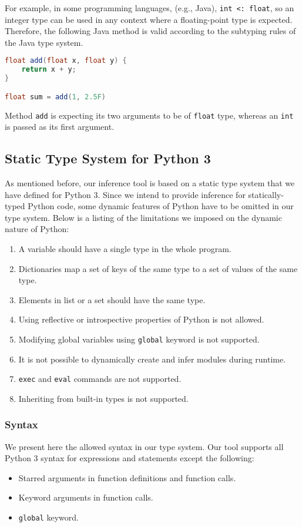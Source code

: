 For example, in some programming languages, (e.g., Java), \lstinline|int <: float|, so an integer type can be used in any context where a floating-point type is expected. Therefore, the following Java method is valid according to the subtyping rules of the Java type system.

\begin{lstlisting}[language=java]
float add(float x, float y) {
	return x + y;
}

float sum = add(1, 2.5F)
\end{lstlisting}

Method \lstinline|add| is expecting its two arguments to be of \lstinline|float| type, whereas an \lstinline|int| is passed as its first argument.


\subsection{Static Type System for Python 3}
As mentioned before, our inference tool is based on a static type system that we have defined for Python 3. Since we intend to provide inference for statically-typed Python code, some dynamic features of Python have to be omitted in our type system. Below is a listing of the limitations we imposed on the dynamic nature of Python:
\begin{enumerate}
	\item A variable should have a single type in the whole program.
	\item Dictionaries map a set of keys of the same type to a set of values of the same type.
	\item Elements in list or a set should have the same type.
	\item Using reflective or introspective properties of Python is not allowed.
	\item Modifying global variables using \lstinline|global| keyword is not supported.
	\item It is not possible to dynamically create and infer modules during runtime.
	\item \lstinline|exec| and \lstinline|eval| commands are not supported.
	\item Inheriting from built-in types is not supported.
\end{enumerate}

\subsubsection{Syntax}
We present here the allowed syntax in our type system. Our tool supports all Python 3 syntax for expressions and statements except the following:
\begin{itemize}
	\item Starred arguments in function definitions and function calls.
	\item Keyword arguments in function calls.
	\item \lstinline|global| keyword.
\end{itemize}

